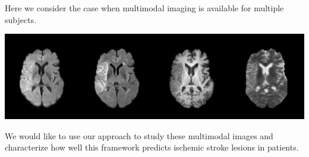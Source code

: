 \documentclass[a0,landscape]{a0poster}
\begin{document}
\begin{multicols}{3}
\noindent Here we consider the case when multimodal imaging is available for multiple subjects. 
\begin{center}\vspace{.25cm}
\includegraphics[width=1\linewidth]{image_ex.pdf}
\end{center}\vspace{.5cm}

\noindent We would like to use our approach to study these multimodal images and characterize how well this framework predicts ischemic stroke lesions in patients.


\end{multicols}
\end{document}
